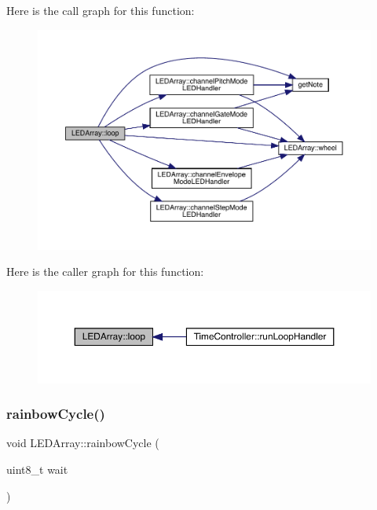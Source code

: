 Here is the call graph for this function\+:
\nopagebreak
\begin{figure}[H]
\begin{center}
\leavevmode
\includegraphics[width=350pt]{class_l_e_d_array_a13f7dd3ae81862c31331199c732f8a3e_cgraph}
\end{center}
\end{figure}
Here is the caller graph for this function\+:
\nopagebreak
\begin{figure}[H]
\begin{center}
\leavevmode
\includegraphics[width=350pt]{class_l_e_d_array_a13f7dd3ae81862c31331199c732f8a3e_icgraph}
\end{center}
\end{figure}
\mbox{\label{class_l_e_d_array_af787dadd33b8c2049de93f8e91bc60ab}} 
\subsubsection{\texorpdfstring{rainbow\+Cycle()}{rainbowCycle()}}
{\footnotesize\ttfamily void L\+E\+D\+Array\+::rainbow\+Cycle (\begin{DoxyParamCaption}\item[{uint8\+\_\+t}]{wait }\end{DoxyParamCaption})}


